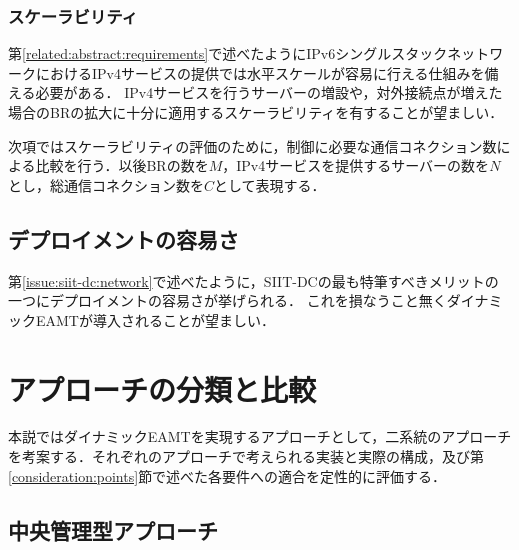 \subsubsection{スケーラビリティ}
第\ref{related:abstract:requirements}で述べたようにIPv6シングルスタックネットワークにおけるIPv4サービスの提供では水平スケールが容易に行える仕組みを備える必要がある．
IPv4サービスを行うサーバーの増設や，対外接続点が増えた場合のBRの拡大に十分に適用するスケーラビリティを有することが望ましい．

次項ではスケーラビリティの評価のために，制御に必要な通信コネクション数による比較を行う．以後BRの数を$M$，IPv4サービスを提供するサーバーの数を$N$とし，総通信コネクション数を$C$として表現する．


%

\subsection{デプロイメントの容易さ}
第\ref{issue:siit-dc:network}で述べたように，SIIT-DCの最も特筆すべきメリットの一つにデプロイメントの容易さが挙げられる．
これを損なうこと無くダイナミックEAMTが導入されることが望ましい．


\section{アプローチの分類と比較}
\label{consideration:approach}
本説ではダイナミックEAMTを実現するアプローチとして，二系統のアプローチを考案する．それぞれのアプローチで考えられる実装と実際の構成，及び第\ref{consideration:points}節で述べた各要件への適合を定性的に評価する．



\subsection{中央管理型アプローチ}
\label{consideration:approach:centerized}

